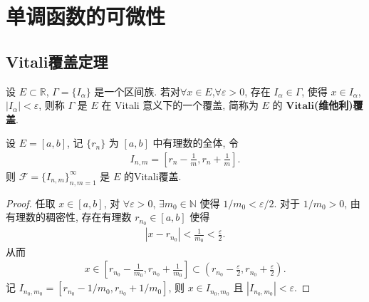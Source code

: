 \documentclass[../../main.tex]{subfiles}%
\begin{document}
\section{单调函数的可微性}

\subsection{Vitali覆盖定理}

\begin{definition}[Vitali覆盖]
设 $E\subset\mathbb{R}$, $\Gamma=\{I_\alpha\}$ 是一个区间族. 若对$\forall x\in E$,$\forall \varepsilon>0$, 存在 $I_\alpha\in\Gamma$, 使得 $x\in I_\alpha$, $|I_\alpha|<\varepsilon$, 则称 $\Gamma$ 是 $E$ 在 Vitali 意义下的一个覆盖, 简称为 $E$ 的 $\mathbf{Vitali}$\textbf{(维他利)覆盖}.
\end{definition}

\begin{example}
设 $E=[a,b]$, 记 $\{r_n\}$ 为 $[a,b]$ 中有理数的全体, 令
\begin{align*}
I_{n,m}=\left[r_n-\frac{1}{m}, r_n+\frac{1}{m}\right].
\end{align*}
则 $\mathcal{F}=\{I_{n,m}\}_{n,m=1}^\infty$ 是 $E$ 的Vitali覆盖.
\end{example}
\begin{proof}

任取 $x\in[a,b]$, 对 $\forall\varepsilon>0$, $\exists m_0\in\mathbb{N}$ 使得 $1/m_0<\varepsilon/2$. 对于 $1/m_0>0$, 由有理数的稠密性, 存在有理数 $r_{n_0}\in[a,b]$ 使得
\begin{align*}
|x-r_{n_0}|<\frac{1}{m_0}<\frac{\varepsilon}{2}.
\end{align*}
从而
\begin{align*}
x\in\left[r_{n_0}-\frac{1}{m_0}, r_{n_0}+\frac{1}{m_0}\right]\subset\left(r_{n_0}-\frac{\varepsilon}{2}, r_{n_0}+\frac{\varepsilon}{2}\right).
\end{align*}
记 $I_{n_0,m_0}=[r_{n_0}-1/m_0, r_{n_0}+1/m_0]$, 则 $x\in I_{n_0,m_0}$ 且 $|I_{n_0,m_0}|<\varepsilon$.

\end{proof}
\end{document}

